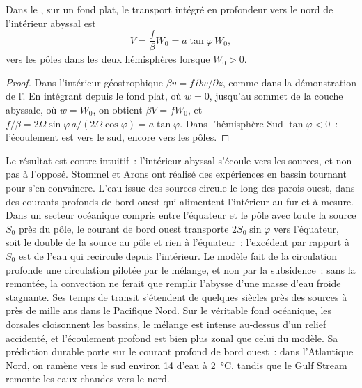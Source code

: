 \begin{proposition}\label{prop:b3:ocean-dynamics:abyssal}
Dans le , sur un fond plat, le transport
intégré en profondeur vers le nord de l'intérieur abyssal est
\[
V = \frac{f}{\beta}W_0 = a\tan\varphi\,W_0 ,
\]
vers les pôles dans les deux hémisphères lorsque $W_0 > 0$.
\end{proposition}

\begin{proof}
Dans l'intérieur géostrophique $\beta v = f\,\partial w/\partial z$, comme dans la
démonstration de l'. En intégrant depuis le fond plat, où
$w = 0$, jusqu'au sommet de la couche abyssale, où $w = W_0$, on obtient $\beta V =
fW_0$, et $f/\beta = 2\Omega\sin\varphi\,a/(2\Omega\cos\varphi) =
a\tan\varphi$. Dans l'hémisphère Sud $\tan\varphi < 0$~: l'écoulement est
vers le sud, encore vers les pôles.
\end{proof}

Le résultat est contre-intuitif~: l'intérieur abyssal s'écoule vers les
sources, et non pas à l'opposé. Stommel et Arons ont réalisé des expériences en
bassin tournant pour s'en convaincre. L'eau issue des sources circule
le long des parois ouest, dans des courants profonds de bord ouest qui alimentent
l'intérieur au fur et à mesure. Dans un secteur océanique compris entre l'équateur et le pôle
avec toute la source $S_0$ près du pôle, le courant de bord ouest
transporte $2S_0\sin\varphi$ vers l'équateur, soit le double de la source au pôle
et rien à l'équateur~: l'excédent par rapport à $S_0$ est de l'eau qui recircule
depuis l'intérieur. Le modèle fait de la circulation profonde une circulation pilotée par le mélange,
et non par la subsidence~: sans la remontée, la convection ne ferait
que remplir l'abysse d'une masse d'eau froide stagnante. Ses temps de transit s'étendent de
quelques siècles près des sources à près de mille ans dans le
Pacifique Nord. Sur le véritable fond océanique, les dorsales cloisonnent les bassins, le mélange
est intense au-dessus d'un relief accidenté, et l'écoulement profond est bien plus zonal que
celui du modèle. Sa prédiction durable porte sur le courant profond de bord ouest~: dans
l'Atlantique Nord, on ramène vers le sud environ \qty{14}{\sverdrup} d'eau à
\qty{2}{\celsius}, tandis que le Gulf Stream remonte
les eaux chaudes vers le nord.

